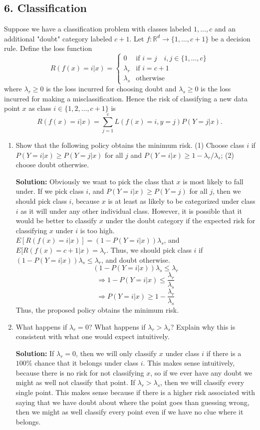\documentclass{article}
\newcommand{\solution}{\textbf{Solution: }}
\newcommand{\R}{\mathbb{R}}
\begin{document}
\subsection*{6. Classification}
Suppose we have a classification problem with classes labeled $1, \ldots, c$ and an additional "doubt" category labeled $c+1$. Let $f: \R^d \rightarrow \{1, \ldots, c+1\}$ be a decision rule. Define the loss function 
$$ R(f(x) = i|x) = 
\begin{cases}
0 & \text{if }i = j \quad i, j \in \{1, \ldots, c\} \\
\lambda_r & \text{if } i=c + 1 \\
\lambda_s & \text{otherwise}
\end{cases} $$
where $\lambda_r \geq 0$ is the loss incurred for choosing doubt and $\lambda_s \geq 0$ is the loss incurred for making a misclassification. Hence the risk of classifying a new data point $x$ as class $i \in \{1, 2, \ldots, c+1\}$ is $$R(f(x) = i|x) = \sum_{j=1}^c L(f(x) = i, y = j) P(Y = j|x).$$
\begin{enumerate}[label=(\alph*)]
    \item Show that the following policy obtains the minimum risk. (1) Choose class $i$ if $P(Y = i|x) \geq P(Y = j|x)$ for all $j$ and $P(Y=i|x) \geq 1 - \lambda_r / \lambda_s$; (2) choose doubt otherwise. 
    \begin{mdframed}
    \solution Obviously we want to pick the class that $x$ is most likely to fall under. If we pick class $i$, and $P(Y=i|x) \geq P(Y=j)$ for all $j$, then we should pick class $i$, because $x$ is at least as likely to be categorized under class $i$ as it will under any other individual class. However, it is possible that it would be better to classify $x$ under the doubt category if the expected risk for classifying $x$ under $i$ is too high. $E[R(f(x)=i|x)]=(1-P(Y=i|x))\lambda_s$, and $E[R(f(x)=c+1|x)=\lambda_r$. Thus, we should pick class $i$ if $(1-P(Y=i|x))\lambda_s \leq \lambda_r$, and doubt otherwise.
    $$(1-P(Y=i|x))\lambda_s \leq \lambda_r$$
    $$\Rightarrow 1-P(Y=i|x) \leq \frac{\lambda_r}{\lambda_s}$$
    $$\Rightarrow P(Y=i|x) \geq 1-\frac{\lambda_r}{\lambda_s}$$
    Thus, the proposed policy obtains the minimum risk.
    \end{mdframed}
    
    \item What happens if $\lambda_r = 0$? What happens if $\lambda_r > \lambda_s$?  Explain why this is consistent with what one would expect intuitively. 
    \begin{mdframed}
    \solution If $\lambda_r=0$, then we will only classify $x$ under class $i$ if there is a $100\%$ chance that it belongs under class $i$. This makes sense intuitively, because there is no risk for not classifying $x$, so if we ever have any doubt we might as well not classify that point. If $\lambda_r>\lambda_s$, then we will classify every single point. This makes sense because if there is a higher risk associated with saying that we have doubt about where the point goes than guessing wrong, then we might as well classify every point even if we have no clue where it belongs.
    \end{mdframed}
\end{enumerate}
\end{document}
